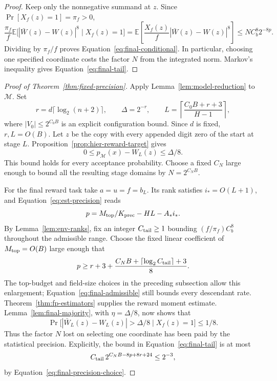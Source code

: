 \begin{proof}
Keep only the nonnegative summand at $z$. Since
$\Pr[X_f(z)=1]=\pi_f>0$,
\[
 \frac{\pi_f}{f}
 \mathbb E\bigl[|\bar W(z)-W(z)|^8\mid X_f(z)=1\bigr]
 =\mathbb E\!\left[\frac{X_f(z)}f|\bar W(z)-W(z)|^8\right]
 \le N C_b^8 2^{-8p}.
\]
Dividing by $\pi_f/f$ proves
Equation~\eqref{eq:final-conditional}. In particular, choosing one
specified coordinate costs the factor $N$ from the integrated norm.
Markov's inequality gives Equation~\eqref{eq:final-tail}.
\end{proof}

\begin{proof}[Proof of Theorem~\ref{thm:fixed-precision}]
Apply Lemma~\ref{lem:model-reduction} to $\mathcal M$. Set
\[
 r=d\lceil\log_2(n+2)\rceil,\qquad \Delta=2^{-r},\qquad
 L=\left\lceil\frac{C_0B+r+3}{H-1}\right\rceil,
\]
where $|V_0|\le2^{C_0B}$ is an explicit configuration bound.
Since $d$ is fixed, $r,L=O(B)$. Let $z$ be the copy with every appended digit zero of
the start at stage $L$. Proposition~\ref{prop:hier-reward-target}
gives
\begin{equation}\label{eq:final-hierarchy-accuracy}
 0\le p_{\mathcal M}(x)-W_L(z)\le\Delta/8.
\end{equation}
This bound holds for every acceptance probability. Choose a fixed
$C_N$ large enough to bound all the resulting stage domains by
$N=2^{C_NB}$.

For the final reward task take $a=u=f=b_L$. Its rank satisfies
$i_*=O(L+1)$, and Equation~\eqref{eq:est-precision} reads
\[
 p=M_{\rm top}/K_{\rm prec}-HL-A_*i_*.
\]
By Lemma~\ref{lem:env-ranks}, fix an integer $C_{\rm tail}\ge1$ bounding
$(f/\pi_f)C_b^8$ throughout the admissible range. Choose the fixed
linear coefficient of $M_{\rm top}=O(B)$ large enough that
\begin{equation}\label{eq:final-precision-choice}
 p\ge r+3+\frac{C_NB+\lceil\log_2 C_{\rm tail}\rceil+3}{8}.
\end{equation}
The top-budget and field-size choices in the preceding subsection
allow this enlargement; Equation~\eqref{eq:final-admissible} still
bounds every descendant rate. Theorem~\ref{thm:fp-estimators}
supplies the reward moment estimate. Lemma~\ref{lem:final-majority},
with $\eta=\Delta/8$, now shows that
\begin{equation}\label{eq:final-good-environments}
 \Pr\bigl[|\bar W_L(z)-W_L(z)|>\Delta/8
       \mid X_f(z)=1\bigr]\le1/8.
\end{equation}
Thus the factor $N$ lost on selecting one coordinate has been paid
by the statistical precision. Explicitly, the bound in
Equation~\eqref{eq:final-tail} is at most
\[
 C_{\rm tail}\,2^{C_NB-8p+8r+24}\le 2^{-3},
\]
by Equation~\eqref{eq:final-precision-choice}.


\end{proof}
